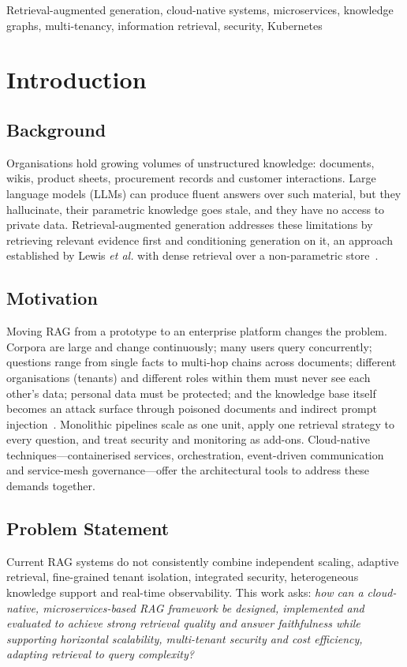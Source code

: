 \documentclass[journal]{IEEEtran}
\begin{document}
\begin{IEEEkeywords}
Retrieval-augmented generation, cloud-native systems, microservices, knowledge graphs, multi-tenancy,
information retrieval, security, Kubernetes
\end{IEEEkeywords}

\section{Introduction}

\subsection{Background}
Organisations hold growing volumes of unstructured knowledge: documents, wikis, product sheets,
procurement records and customer interactions. Large language models (LLMs) can produce fluent answers
over such material, but they hallucinate, their parametric knowledge goes stale, and they have no access
to private data. Retrieval-augmented generation addresses these limitations by retrieving relevant
evidence first and conditioning generation on it, an approach established by Lewis \textit{et al.}
with dense retrieval over a non-parametric store~\cite{lewis2020rag}.

\subsection{Motivation}
Moving RAG from a prototype to an enterprise platform changes the problem. Corpora are large and change
continuously; many users query concurrently; questions range from single facts to multi-hop chains across
documents; different organisations (tenants) and different roles within them must never see each
other's data; personal data must be protected; and the knowledge base itself becomes an attack surface
through poisoned documents and indirect prompt injection~\cite{ammann2025securing}. Monolithic pipelines
scale as one unit, apply one retrieval strategy to every question, and treat security and monitoring as
add-ons. Cloud-native techniques---containerised services, orchestration, event-driven communication and
service-mesh governance---offer the architectural tools to address these demands together.

\subsection{Problem Statement}
Current RAG systems do not consistently combine independent scaling, adaptive retrieval, fine-grained
tenant isolation, integrated security, heterogeneous knowledge support and real-time observability.
This work asks: \emph{how can a cloud-native, microservices-based RAG framework be designed, implemented
and evaluated to achieve strong retrieval quality and answer faithfulness while supporting horizontal
scalability, multi-tenant security and cost efficiency, adapting retrieval to query complexity?}
\end{document}
